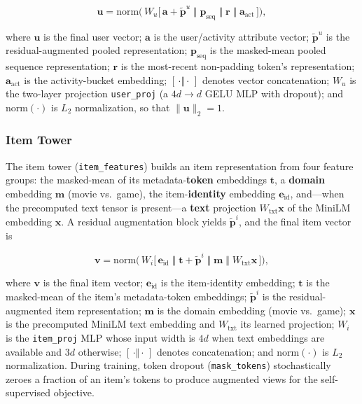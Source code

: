 \begin{equation}
\mathbf{u} = \mathrm{norm}\!\Big(\,W_u\big[\,\mathbf{a}+\tilde{\mathbf{p}}^{u}\;\Vert\;\mathbf{p}_{\text{seq}}\;\Vert\;\mathbf{r}\;\Vert\;\mathbf{a}_{\text{act}}\,\big]\Big),
\label{eq:user_vector}
\end{equation}

where $\mathbf{u}$ is the final user vector; $\mathbf{a}$ is the user/activity attribute vector; $\tilde{\mathbf{p}}^{u}$ is the residual-augmented pooled representation; $\mathbf{p}_{\text{seq}}$ is the masked-mean pooled sequence representation; $\mathbf{r}$ is the most-recent non-padding token's representation; $\mathbf{a}_{\text{act}}$ is the activity-bucket embedding; $[\,\cdot\Vert\cdot\,]$ denotes vector concatenation; $W_u$ is the two-layer projection \texttt{user\_proj} (a $4d\!\to\!d$ GELU MLP with dropout); and $\mathrm{norm}(\cdot)$ is $L_2$ normalization, so that $\lVert\mathbf{u}\rVert_2 = 1$.

\subsubsection{Item Tower}
The item tower (\texttt{item\_features}) builds an item representation from four feature groups: the masked-mean of its metadata-\textbf{token} embeddings $\mathbf{t}$, a \textbf{domain} embedding $\mathbf{m}$ (movie vs.\ game), the item-\textbf{identity} embedding $\mathbf{e}_{\text{id}}$, and---when the precomputed text tensor is present---a \textbf{text} projection $W_{\text{txt}}\mathbf{x}$ of the MiniLM embedding $\mathbf{x}$. A residual augmentation block yields $\tilde{\mathbf{p}}^{i}$, and the final item vector is

\begin{equation}
\mathbf{v} = \mathrm{norm}\!\Big(\,W_i\big[\,\mathbf{e}_{\text{id}}\;\Vert\;\mathbf{t}+\tilde{\mathbf{p}}^{i}\;\Vert\;\mathbf{m}\;\Vert\;W_{\text{txt}}\mathbf{x}\,\big]\Big),
\label{eq:item_vector}
\end{equation}

where $\mathbf{v}$ is the final item vector; $\mathbf{e}_{\text{id}}$ is the item-identity embedding; $\mathbf{t}$ is the masked-mean of the item's metadata-token embeddings; $\tilde{\mathbf{p}}^{i}$ is the residual-augmented item representation; $\mathbf{m}$ is the domain embedding (movie vs.\ game); $\mathbf{x}$ is the precomputed MiniLM text embedding and $W_{\text{txt}}$ its learned projection; $W_i$ is the \texttt{item\_proj} MLP whose input width is $4d$ when text embeddings are available and $3d$ otherwise; $[\,\cdot\Vert\cdot\,]$ denotes concatenation; and $\mathrm{norm}(\cdot)$ is $L_2$ normalization. During training, token dropout (\texttt{mask\_tokens}) stochastically zeroes a fraction of an item's tokens to produce augmented views for the self-supervised objective.

